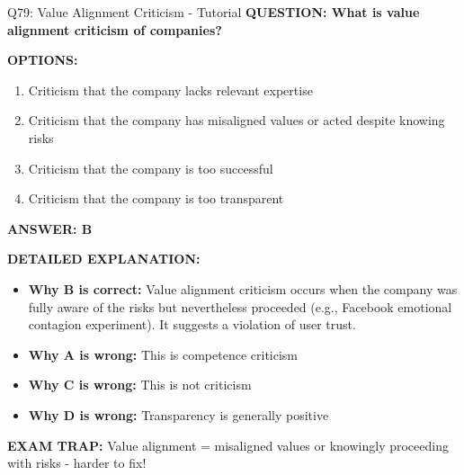 \documentclass[8pt]{beamer}
\begin{document}
	\begin{frame}{Q79: Value Alignment Criticism - Tutorial}
		\fontsize{6.5}{7.5}\selectfont
		\textbf{QUESTION: What is value alignment criticism of companies?}
		
		\vspace{0.1cm}
		\textbf{OPTIONS:}
		\begin{enumerate}
			\item Criticism that the company lacks relevant expertise
			\item Criticism that the company has misaligned values or acted despite knowing risks
			\item Criticism that the company is too successful
			\item Criticism that the company is too transparent
		\end{enumerate}
		
		\vspace{0.1cm}
		\textcolor{myblue}{\textbf{ANSWER: B}}
		
		\vspace{0.1cm}
		\textbf{DETAILED EXPLANATION:}
		\begin{itemize}
			\item \textbf{Why B is correct:} Value alignment criticism occurs when the company was fully aware of the risks but nevertheless proceeded (e.g., Facebook emotional contagion experiment). It suggests a violation of user trust.
			\item \textbf{Why A is wrong:} This is competence criticism
			\item \textbf{Why C is wrong:} This is not criticism
			\item \textbf{Why D is wrong:} Transparency is generally positive
		\end{itemize}
		
		\textcolor{myred}{\textbf{EXAM TRAP:}} Value alignment = \textcolor{myblue}{misaligned values or knowingly proceeding with risks} - harder to fix!
	\end{frame}
	
\end{document}
